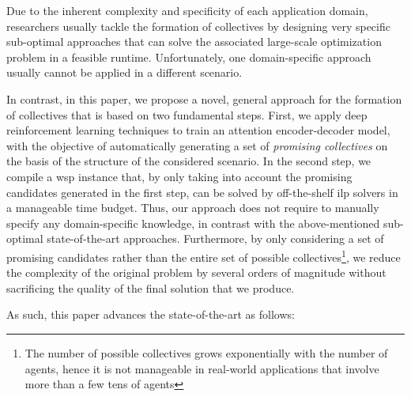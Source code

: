 \documentclass{article}
\theoremstyle{definition}
\begin{document}
Due to the inherent complexity and specificity of each application domain, researchers usually tackle the formation of collectives by designing very specific sub-optimal approaches that can solve the associated large-scale optimization problem in a feasible runtime.
Unfortunately, one domain-specific approach usually cannot be applied in a different scenario.

In contrast, in this paper, we propose a novel, general approach for the formation of collectives that is based on two fundamental steps.
First, we apply deep reinforcement learning techniques to train an attention encoder-decoder model, with the objective of automatically generating a set of \emph{promising collectives} on the basis of the structure of the considered scenario. 
In the second step, we compile a \gls{wsp} instance that, by only taking into account the promising candidates generated in the first step, can be solved by off-the-shelf \gls{ilp} solvers in a manageable time budget.
Thus, our approach does not require to manually specify any domain-specific knowledge, in contrast with the above-mentioned sub-optimal state-of-the-art approaches.
Furthermore, by only considering a set of promising candidates rather than the entire set of possible collectives\footnote{The number of possible collectives grows exponentially with the number of agents, hence it is not manageable in real-world applications that involve more than a few tens of agents}, we reduce the complexity of the original problem by several orders of magnitude without sacrificing the quality of the final solution that we produce.

As such, this paper advances the state-of-the-art as follows:
\end{document}
